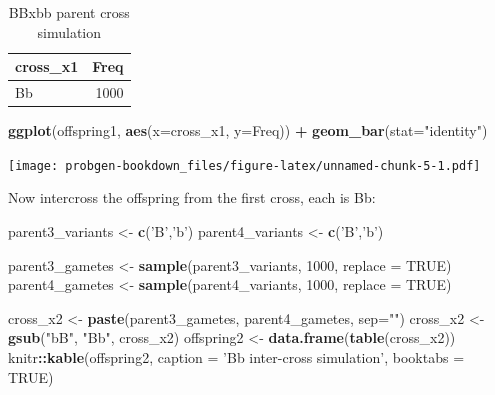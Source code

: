 \documentclass[]{book}
\newenvironment{Shaded}{\begin{snugshade}}{\end{snugshade}}
\newcommand{\KeywordTok}[1]{\textcolor[rgb]{0.13,0.29,0.53}{\textbf{#1}}}
\newcommand{\DataTypeTok}[1]{\textcolor[rgb]{0.13,0.29,0.53}{#1}}
\newcommand{\DecValTok}[1]{\textcolor[rgb]{0.00,0.00,0.81}{#1}}
\newcommand{\StringTok}[1]{\textcolor[rgb]{0.31,0.60,0.02}{#1}}
\newcommand{\OtherTok}[1]{\textcolor[rgb]{0.56,0.35,0.01}{#1}}
\newcommand{\OperatorTok}[1]{\textcolor[rgb]{0.81,0.36,0.00}{\textbf{#1}}}
\newcommand{\NormalTok}[1]{#1}
\theoremstyle{definition}
\theoremstyle{definition}
\theoremstyle{definition}
\theoremstyle{remark}
\begin{document}
\begin{table}

\caption{\label{tab:unnamed-chunk-5}BBxbb parent cross simulation}
\centering
\begin{tabular}[t]{lr}
\toprule
cross\_x1 & Freq\\
\midrule
Bb & 1000\\
\bottomrule
\end{tabular}
\end{table}

\begin{Shaded}
\begin{Highlighting}[]
\KeywordTok{ggplot}\NormalTok{(offspring1, }\KeywordTok{aes}\NormalTok{(}\DataTypeTok{x=}\NormalTok{cross_x1, }\DataTypeTok{y=}\NormalTok{Freq)) }\OperatorTok{+}\StringTok{ }\KeywordTok{geom_bar}\NormalTok{(}\DataTypeTok{stat=}\StringTok{"identity"}\NormalTok{)}
\end{Highlighting}
\end{Shaded}

\texttt{[image: probgen-bookdown\_files/figure-latex/unnamed-chunk-5-1.pdf]}

Now intercross the offspring from the first cross, each is Bb:

\begin{Shaded}
\begin{Highlighting}[]
\NormalTok{parent3_variants <-}\StringTok{ }\KeywordTok{c}\NormalTok{(}\StringTok{'B'}\NormalTok{,}\StringTok{'b'}\NormalTok{)}
\NormalTok{parent4_variants <-}\StringTok{ }\KeywordTok{c}\NormalTok{(}\StringTok{'B'}\NormalTok{,}\StringTok{'b'}\NormalTok{)}

\NormalTok{parent3_gametes <-}\StringTok{ }\KeywordTok{sample}\NormalTok{(parent3_variants, }\DecValTok{1000}\NormalTok{, }\DataTypeTok{replace =} \OtherTok{TRUE}\NormalTok{)}
\NormalTok{parent4_gametes <-}\StringTok{ }\KeywordTok{sample}\NormalTok{(parent4_variants, }\DecValTok{1000}\NormalTok{, }\DataTypeTok{replace =} \OtherTok{TRUE}\NormalTok{)}

\NormalTok{cross_x2 <-}\StringTok{ }\KeywordTok{paste}\NormalTok{(parent3_gametes, parent4_gametes, }\DataTypeTok{sep=}\StringTok{""}\NormalTok{)}
\NormalTok{cross_x2 <-}\StringTok{ }\KeywordTok{gsub}\NormalTok{(}\StringTok{"bB"}\NormalTok{, }\StringTok{"Bb"}\NormalTok{, cross_x2)}
\NormalTok{offspring2 <-}\StringTok{ }\KeywordTok{data.frame}\NormalTok{(}\KeywordTok{table}\NormalTok{(cross_x2))}
\NormalTok{knitr}\OperatorTok{::}\KeywordTok{kable}\NormalTok{(offspring2, }\DataTypeTok{caption =} \StringTok{'Bb inter-cross simulation'}\NormalTok{, }\DataTypeTok{booktabs =} \OtherTok{TRUE}\NormalTok{)}
\end{Highlighting}
\end{Shaded}
\end{document}
